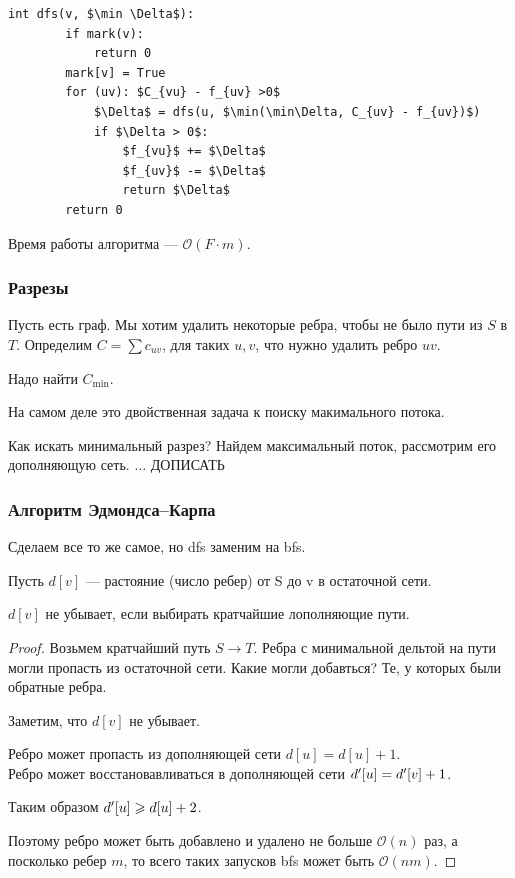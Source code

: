 \begin{lstlisting}[mathescape=true]
    int dfs(v, $\min \Delta$):
        if mark(v):
            return 0
        mark[v] = True
        for (uv): $C_{vu} - f_{uv} >0$
            $\Delta$ = dfs(u, $\min(\min\Delta, C_{uv} - f_{uv})$)
            if $\Delta > 0$:
                $f_{vu}$ += $\Delta$
                $f_{uv}$ -= $\Delta$
                return $\Delta$
        return 0
\end{lstlisting}

Время работы алгоритма --- $\mathcal{O}(F \cdot m)$.

\subsubsection{Разрезы}
\begin{problem}
Пусть есть граф. Мы хотим удалить некоторые ребра, чтобы не было пути из $S$ в $T$.
Определим $C = \sum c_{uv}$, для таких $u,v$, что нужно удалить ребро $uv$.

Надо найти $C_{\min}$.
\end{problem}

На самом деле это двойственная задача к поиску макимального потока.

Как искать минимальный разрез? Найдем максимальный поток, рассмотрим его дополняющую сеть. $\ldots$ ДОПИСАТЬ

\subsubsection{Алгоритм Эдмондса--Карпа}
Сделаем все то же самое, но dfs заменим на bfs.

Пусть $d[v]$ --- растояние (число ребер) от S до v в остаточной сети.

\begin{theorem}
    $d[v]$ не убывает, если выбирать кратчайшие лополняющие пути.
\end{theorem}
\begin{proof}
    Возьмем кратчайший путь $S \to T$. Ребра с минимальной дельтой на пути могли пропасть из остаточной сети. Какие могли добавться? Те, у которых были обратные ребра.

    Заметим, что $d[v]$ не убывает.

    Ребро может пропасть из дополняющей сети $d[u] = d[u] + 1$.\\
    Ребро может восстановавливаться в дополняющей сети $d^{\prime}[u]  = d^{\prime} [ v] + 1$.

    Таким образом $d^{\prime} [u] \geqslant d[u] + 2$.

    Поэтому ребро может быть добавлено и удалено не больше $\mathcal{O}(n)$ раз, а посколько ребер $m$, то всего таких запусков bfs может быть $\mathcal{O}(n m)$.
\end{proof}

